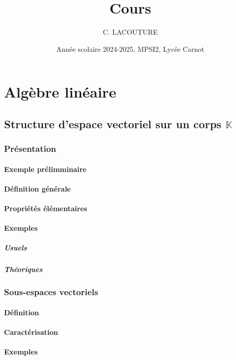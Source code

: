 \documentclass[12pt,a4paper,french]{book}
\title{Cours}
\author{C. LACOUTURE}
\date{Année scolaire 2024-2025, MPSI2, Lycée Carnot}
\begin{document}
\maketitle
\tableofcontents

\part{Algèbre linéaire}

\chapter{Structure d'espace vectoriel sur un corps $\mathbb{K}$}
	\section{Présentation}
		\subsection{Exemple prélimminaire}
		\subsection{Définition générale}
		\subsection{Propriétés élémentaires}
		\subsection{Exemples}
			\subsubsection{Usuels}
			\subsubsection{Théoriques}
	\section{Sous-espaces vectoriels}
		\subsection{Définition}
		\subsection{Caractérisation}
		\subsection{Exemples}
\end{document}
